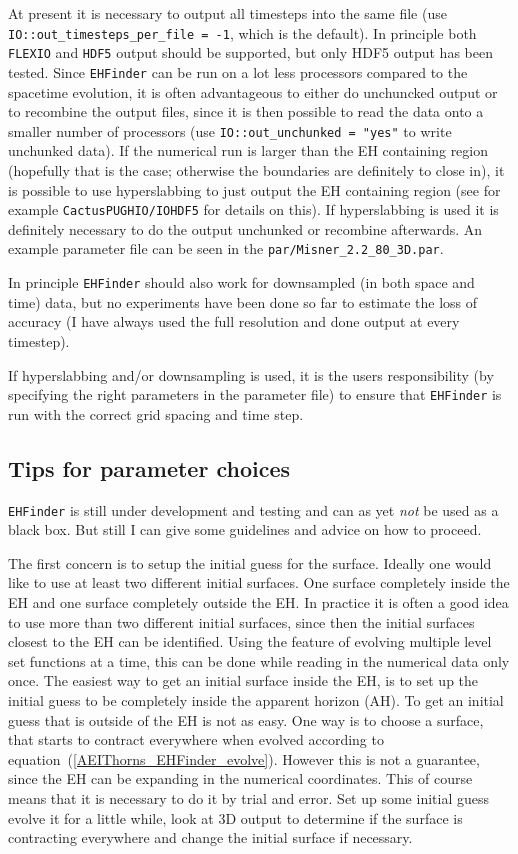 At present it is necessary to output all timesteps into the same file (use
{\tt IO::out\_timesteps\_per\_file = -1}, which is the default). In principle
both {\tt FLEXIO} and {\tt HDF5} output should be supported, but only
HDF5 output has been tested. Since {\tt EHFinder} can be run on a lot less
processors compared to the spacetime evolution, it is often advantageous to
either do unchuncked output or to recombine the output files, since it is then
possible to read the data onto a smaller number of processors (use
{\tt IO::out\_unchunked = "yes"} to write unchunked data). If the numerical
run is larger than the EH containing region (hopefully that is the case;
otherwise the boundaries are definitely to close in), it is possible to
use hyperslabbing to just output the EH containing region (see for example
{\tt CactusPUGHIO/IOHDF5} for details on this). If hyperslabbing is used it
is definitely necessary to do the output unchunked or recombine afterwards.
An example parameter file can be seen in the {\tt par/Misner\_2.2\_80\_3D.par}.

In principle {\tt EHFinder} should also work for downsampled (in both space
and time) data, but no experiments have been done so far to estimate the loss
of accuracy (I have always used the full resolution and done output at
every timestep).

If hyperslabbing and/or downsampling is used, it is the users responsibility
(by specifying the right parameters in the parameter file) to ensure that
{\tt EHFinder} is run with the correct grid spacing and time step.

\subsection{Tips for parameter choices}

{\tt EHFinder} is still under development and testing and can as yet {\em not}
be used as a black box. But still I can give some guidelines and advice on
how to proceed.

The first concern is to setup the initial guess for the surface. Ideally one
would like to use at least two different initial surfaces. One surface 
completely inside the EH and one surface completely outside the EH. In
practice it is often a good idea to use more than two different initial
surfaces, since then the initial surfaces closest to the EH can be identified.
Using the feature of evolving multiple level set functions at a time, this
can be done while reading in the numerical data only once. The easiest way
to get an initial surface inside the EH, is to set up the initial guess to
be completely inside the
apparent horizon (AH). To get an initial guess that is outside of the EH
is not as easy. One way is to choose a surface, that starts to contract
everywhere when evolved according to
equation~(\ref{AEIThorns_EHFinder_evolve}). However this is not a
guarantee, since the EH can be expanding in the numerical coordinates.
This of course means that it is necessary to do it by trial and error.
Set up some initial guess evolve it for a little while, look at 3D output
to determine if the surface is contracting everywhere and change the
initial surface if necessary.

